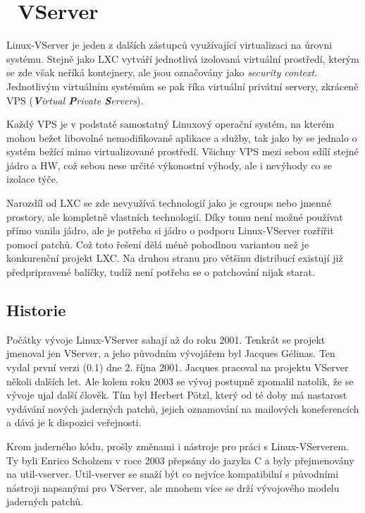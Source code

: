 \section{\linux\ VServer\textsuperscript{\texttrademark}}

Linux-VServer je jeden z dalších zástupců využívající virtualizaci na úrovni systému. Stejně jako LXC vytváří jednotlivá izolovaná virtuální prostředí, kterým se zde však neříká kontejnery, ale jsou označovány jako \emph{security context}. Jednotlivým virtuálním systémům se pak říka virtuální privátní servery, zkráceně VPS (\emph{\textbf{V}irtual \textbf{P}rivate \textbf{S}ervers}).

Každý VPS je v podstatě samostatný Linuxový operační systém, na kterém mohou bežet libovolné nemodifikované aplikace a služby, tak jako by se jednalo o systém bežící mimo virtualizované prostředí. Všichny VPS mezi sebou sdílí stejné jádro a HW, což sebou nese určité výkonostní výhody, ale i nevýhody co se izolace týče.

Narozdíl od LXC se zde nevyužívá technologií jako je cgroups nebo jmenné prostory, ale kompletně vlastních technologií. Díky tomu není možné používat přímo vanila jádro, ale je potřeba si jádro o podporu Linux-VServer rozřířit pomocí patchů. Což toto řešení dělá méně pohodlnou variantou než je konkurenční projekt LXC. Na druhou stranu pro většinu distribucí existují již předpripravené balíčky, tudíž není potřeba se o patchování nijak starat.

\subsection{Historie}
Počátky vývoje Linux-VServer sahají až do roku 2001. Tenkrát se projekt jmenoval jen VServer, a jeho původním vývojářem byl Jacques Gélinas. Ten vydal první verzi (0.1) dne 2. října 2001. Jacques pracoval na projektu VServer několi dalších let. Ale kolem roku 2003 se vývoj postupně zpomalil natolik, že se vývoje ujal další člověk. Tím byl Herbert Pötzl, který od té doby má nastarost vydávání nových jaderných patchů, jejich oznamování na mailových koneferencích a dává je k dispozici veřejnosti.

Krom jaderného kódu, prošly změnami i nástroje pro práci s Linux-VServerem. Ty byli Enrico Scholzem v roce 2003 přepsány do jazyka C a byly přejmenovány na util-vserver. Util-vserver se snaží být co nejvíce kompatibilní s původními nástroji napsanými pro VServer, ale mnohem více se drží vývojového modelu jaderných patchů.

